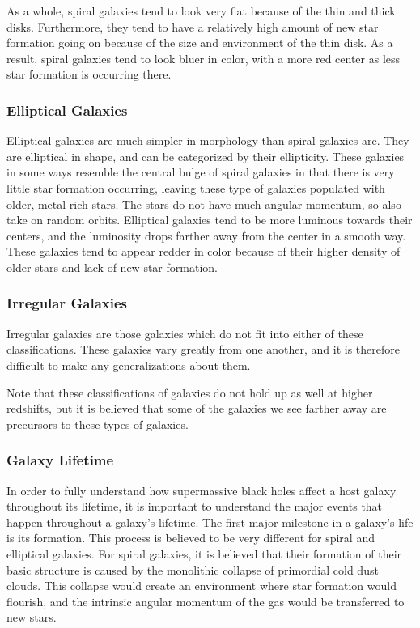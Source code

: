 \documentclass[12pt]{article}
\begin{document}
    As a whole, spiral galaxies tend to look very flat because of the thin and
    thick disks.  Furthermore, they tend to have a relatively high amount of new
    star formation going on because of the size and environment of the thin
    disk.  As a result, spiral galaxies tend to look bluer in color, with a more
    red center as less star formation is occurring there.

    \subsubsection{Elliptical Galaxies}
    Elliptical galaxies are much simpler in morphology than spiral galaxies are.
    They are elliptical in shape, and can be categorized by their ellipticity.
    These galaxies in some ways resemble the central bulge of spiral galaxies in
    that there is very little star formation occurring, leaving these type of
    galaxies populated with older, metal-rich stars.  The stars do not have much
    angular momentum, so also take on random orbits.  Elliptical galaxies tend
    to be more luminous towards their centers, and the luminosity drops farther
    away from the center in a smooth way.  These galaxies tend to appear redder
    in color because of their higher density of older stars and lack of new star
    formation.

    \subsubsection{Irregular Galaxies}
    Irregular galaxies are those galaxies which do not fit into either of these
    classifications.  These galaxies vary greatly from one another, and it is
    therefore difficult to make any generalizations about them.

    Note that these classifications of galaxies do not hold up as well at higher
    redshifts, but it is believed that some of the galaxies we see farther away
    are precursors to these types of galaxies.

    \subsubsection{Galaxy Lifetime}
    In order to fully understand how supermassive black holes affect a host
    galaxy throughout its lifetime, it is important to understand the major
    events that happen throughout a galaxy's lifetime.  The first major
    milestone in a galaxy's life is its formation.  This process is believed to
    be very different for spiral and elliptical galaxies.  For spiral galaxies,
    it is believed that their formation of their basic structure is caused by
    the monolithic collapse of primordial cold dust clouds.  This collapse would
    create an environment where star formation would flourish, and the intrinsic
    angular momentum of the gas would be transferred to new stars.
\end{document}
